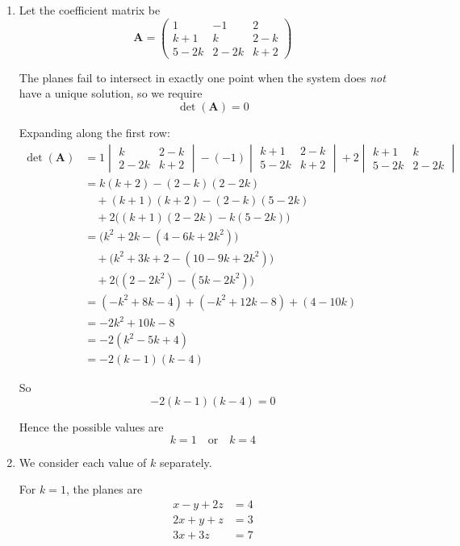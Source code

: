 \documentclass[leqno]{article}
\begin{document}
\begin{enumerate}[
  label=\textbf{\arabic*.},
  leftmargin=*,
  topsep=0pt,
  partopsep=0pt,
  parsep=0pt
]
\vspace*{10pt}

\begin{djsSolution}
\begin{enumerate}[label=\textbf{(\alph*)}]
  \item Let the coefficient matrix be
\[
\mathbf{A}=\begin{pmatrix}
1 & -1 & 2\\
k+1 & k & 2-k\\
5-2k & 2-2k & k+2
\end{pmatrix}
\]

The planes fail to intersect in exactly one point when the system does \emph{not} have a unique solution, so we require
\[
\det(\mathbf{A})=0
\]

Expanding along the first row:
\begin{align*}
\det(\mathbf{A})
&=1\begin{vmatrix}k&2-k\\2-2k&k+2\end{vmatrix}
-(-1)\begin{vmatrix}k+1&2-k\\5-2k&k+2\end{vmatrix}
+2\begin{vmatrix}k+1&k\\5-2k&2-2k\end{vmatrix}\\
&=k(k+2)-(2-k)(2-2k)\\
&\quad +(k+1)(k+2)-(2-k)(5-2k)\\
&\quad +2\bigl((k+1)(2-2k)-k(5-2k)\bigr)\\
&=\bigl(k^2+2k-(4-6k+2k^2)\bigr)\\
&\quad +\bigl(k^2+3k+2-(10-9k+2k^2)\bigr)\\
&\quad +2\bigl((2-2k^2)-(5k-2k^2)\bigr)\\
&=(-k^2+8k-4)+(-k^2+12k-8)+(4-10k)\\
&=-2k^2+10k-8\\
&=-2(k^2-5k+4)\\
&=-2(k-1)(k-4)
\end{align*}

So
\[
-2(k-1)(k-4)=0
\]

Hence the possible values are
\[
k=1 \quad \text{or} \quad k=4
\]

\item We consider each value of \(k\) separately.

\medskip

For \(k=1\), the planes are
\[
\begin{aligned}
x-y+2z&=4\\
2x+y+z&=3\\
3x+3z&=7
\end{aligned}
\]


\end{enumerate}
\end{djsSolution}
\end{enumerate}
\end{document}
